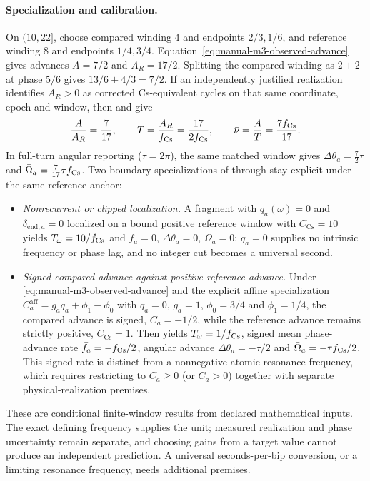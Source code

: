 \paragraph{Specialization and calibration.}
On \((10,22]\), choose compared winding \(4\) and endpoints
\(2/3,1/6\), and reference winding \(8\) and endpoints \(1/4,3/4\).
Equation~\eqref{eq:manual-m3-observed-advance} gives advances
\(A=7/2\) and \(A_R=17/2\). Splitting the compared winding as \(2+2\)
at phase \(5/6\) gives \(13/6+4/3=7/2\).
If an independently justified realization identifies \(A_R>0\) as corrected
Cs-equivalent cycles on that same coordinate, epoch and window, then
 and
 give
\begin{equation}
 \frac{A}{A_R}=\frac7{17},\qquad
 T=\frac{A_R}{f_{\rm Cs}}=\frac{17}{2f_{\rm Cs}},\qquad
 \bar\nu=\frac{A}{T}=\frac{7f_{\rm Cs}}{17}.
 \label{eq:manual-m3-accumulated-si}
\end{equation}
In full-turn angular reporting (\(\tau=2\pi\)), the same matched window gives
\(\Delta\theta_a=\frac{7}{2}\tau\) and
\(\bar\Omega_a=\frac{7}{17}\tau f_{\rm Cs}\).
Two boundary specializations of 
through  stay explicit under the
same reference anchor:
\begin{itemize}[leftmargin=1.6em,itemsep=2pt]
\item \emph{Nonrecurrent or clipped localization.} A fragment with
\(q_a(\omega)=0\) and \(\delta_{\mathrm{end},a}=0\) localized on a bound
positive reference window with \(C_{\mathrm{Cs}}=10\) yields
\(T_\omega=10/f_{\rm Cs}\) and \(\bar f_a=0\), \(\Delta\theta_a=0\),
\(\bar\Omega_a=0\); \(q_a=0\) supplies no intrinsic frequency or phase lag,
and no integer cut becomes a universal second.
\item \emph{Signed compared advance against positive reference advance.}
Under \eqref{eq:manual-m3-observed-advance} and the explicit affine
specialization \(C_a^{\mathrm{aff}}=g_a q_a+\phi_1-\phi_0\) with
\(q_a=0\), \(g_a=1\), \(\phi_0=3/4\) and \(\phi_1=1/4\), the compared advance
is signed, \(C_a=-1/2\), while the reference advance remains strictly positive,
\(C_{\mathrm{Cs}}=1\). Then 
yields \(T_\omega=1/f_{\rm Cs}\), signed mean phase-advance rate
\(\bar f_a=-f_{\rm Cs}/2\), angular advance \(\Delta\theta_a=-\tau/2\) and
\(\bar\Omega_a=-\tau f_{\rm Cs}/2\). This signed rate is distinct from a
nonnegative atomic resonance frequency, which requires restricting to
\(C_a\ge 0\) (or \(C_a>0\)) together with separate physical-realization premises.
\end{itemize}
These are conditional finite-window results from declared mathematical inputs.
The exact defining frequency supplies the unit; measured realization and
phase uncertainty remain separate, and choosing gains from a target value
cannot produce an independent prediction. A universal seconds-per-bip
conversion, or a limiting resonance frequency, needs additional premises.

